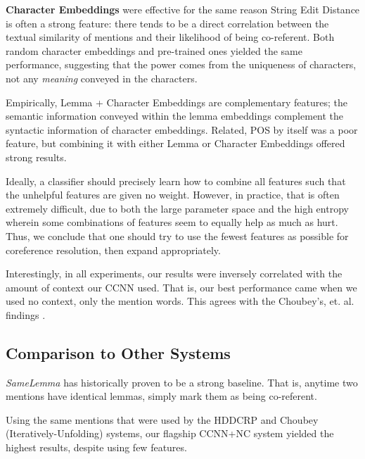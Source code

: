 \documentclass[11pt,a4paper]{article}
\begin{document}
\textbf{Character Embeddings} were effective for the same reason String Edit Distance is often a strong feature: there tends to be a direct correlation between the textual similarity of mentions and their likelihood of being co-referent. Both random character embeddings and pre-trained ones yielded the same performance, suggesting that the power comes from the uniqueness of characters, not any \textit{meaning} conveyed in the characters.

Empirically, Lemma + Character Embeddings are complementary features; the semantic information conveyed within the lemma embeddings complement the syntactic information of character embeddings.  Related, POS by itself was a poor feature, but combining it with either Lemma or Character Embeddings offered strong results. 

Ideally, a classifier should precisely learn how to combine all features such that the unhelpful features are given no weight.  However, in practice, that is often extremely difficult, due to both the large parameter space and the high entropy wherein some combinations of features seem to equally help as much as hurt.  Thus, we conclude that one should try to use the fewest features as possible for coreference resolution, then expand appropriately.

Interestingly, in all experiments, our results were inversely correlated with the amount of context our CCNN used.  That is, our best performance came when we used no context, only the mention words.  This agrees with the Choubey's, et. al. findings .

\subsection{Comparison to Other Systems}
\textit{SameLemma} has historically proven to be a strong baseline.  That is, anytime two mentions have identical lemmas, simply mark them as being co-referent.

Using the same mentions that were used by the HDDCRP and Choubey (Iteratively-Unfolding) systems, our flagship CCNN+NC system yielded the highest results, despite using few features.



\end{document}
